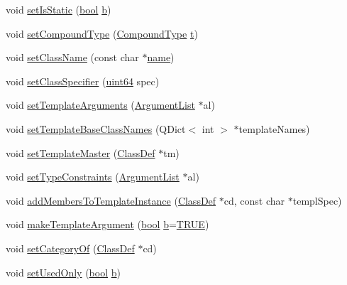\begin{DoxyCompactItemize}
\item 
void \hyperlink{class_class_def_a012459afa4539eddb883b85fc6e69412}{set\+Is\+Static} (\hyperlink{qglobal_8h_a1062901a7428fdd9c7f180f5e01ea056}{bool} \hyperlink{060__command__switch_8tcl_a68bdb74c144118d936931c46f75d4b3e}{b})
\item 
void \hyperlink{class_class_def_aca66bd4014d836ccd64b0d39aab23249}{set\+Compound\+Type} (\hyperlink{class_class_def_ae70cf86d35fe954a94c566fbcfc87939}{Compound\+Type} \hyperlink{058__bracket__recursion_8tcl_a69e959f6901827e4d8271aeaa5fba0fc}{t})
\item 
void \hyperlink{class_class_def_adad7cf7f4706e2cd1b462c215d806d81}{set\+Class\+Name} (const char $\ast$\hyperlink{class_definition_a99481361779e85f0c1556709de7d9e5b}{name})
\item 
void \hyperlink{class_class_def_a9750b5abacf0f4f36e9d422ab0c2a32e}{set\+Class\+Specifier} (\hyperlink{qglobal_8h_a29940ae63ec06c9998bba873e25407ad}{uint64} spec)
\item 
void \hyperlink{class_class_def_ad1904bfd1d375544ae113e5c416bda1b}{set\+Template\+Arguments} (\hyperlink{class_argument_list}{Argument\+List} $\ast$al)
\item 
void \hyperlink{class_class_def_a169b5dd1c61c4febf6c27c809e7f4817}{set\+Template\+Base\+Class\+Names} (Q\+Dict$<$ int $>$ $\ast$template\+Names)
\item 
void \hyperlink{class_class_def_a8abeec8ca715fdf68acefeb38085a9b4}{set\+Template\+Master} (\hyperlink{class_class_def}{Class\+Def} $\ast$tm)
\item 
void \hyperlink{class_class_def_ad590756ae843d8228a1b8b44ba13f8e0}{set\+Type\+Constraints} (\hyperlink{class_argument_list}{Argument\+List} $\ast$al)
\item 
void \hyperlink{class_class_def_a06f99bef9e6f4be508d9e5d9a387ba36}{add\+Members\+To\+Template\+Instance} (\hyperlink{class_class_def}{Class\+Def} $\ast$cd, const char $\ast$templ\+Spec)
\item 
void \hyperlink{class_class_def_a5500484417c1e426604c103497fb55b2}{make\+Template\+Argument} (\hyperlink{qglobal_8h_a1062901a7428fdd9c7f180f5e01ea056}{bool} \hyperlink{060__command__switch_8tcl_a68bdb74c144118d936931c46f75d4b3e}{b}=\hyperlink{qglobal_8h_a04a6422a52070f0dc478693da640242b}{T\+R\+U\+E})
\item 
void \hyperlink{class_class_def_a5d3144a5c93f18c56b301ab28adb12ab}{set\+Category\+Of} (\hyperlink{class_class_def}{Class\+Def} $\ast$cd)
\item 
void \hyperlink{class_class_def_aade2428501a183a16714d3ef67e58fd7}{set\+Used\+Only} (\hyperlink{qglobal_8h_a1062901a7428fdd9c7f180f5e01ea056}{bool} \hyperlink{060__command__switch_8tcl_a68bdb74c144118d936931c46f75d4b3e}{b})

\end{DoxyCompactItemize}
